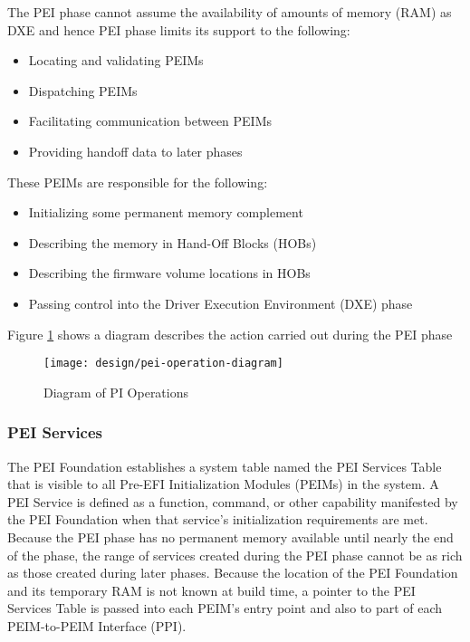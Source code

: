 The PEI phase cannot assume the availability of amounts of memory (RAM) as DXE and hence PEI phase limits its support to the following:
\begin{itemize}
	\item Locating and validating PEIMs
	\item Dispatching PEIMs
	\item Facilitating communication between PEIMs
	\item Providing handoff data to later phases
\end{itemize}

These PEIMs are responsible for the following:
\begin{itemize}
	\item Initializing some permanent memory complement
	\item Describing the memory in Hand-Off Blocks (HOBs)
	\item Describing the firmware volume locations in HOBs
	\item Passing control into the Driver Execution Environment (DXE) phase
\end{itemize}

Figure \ref{fig:design-pei-operation-diagram} shows a diagram describes the action carried out during the PEI phase

\begin{figure}[h]
	\centering
	\texttt{[image: design/pei-operation-diagram]}
	\caption{Diagram of PI Operations}\label{fig:design-pei-operation-diagram}
\end{figure}

\subsubsection{PEI Services}
The PEI Foundation establishes a system table named the PEI Services Table that is visible to all Pre-EFI Initialization Modules (PEIMs) in the system. A PEI Service is defined as a function, command, or other capability manifested by the PEI Foundation when that service’s initialization requirements are met. Because the PEI phase has no permanent memory available until nearly the end of the phase, the range of services created during the PEI phase cannot be as rich as those created during later phases. Because the location of the PEI Foundation and its temporary RAM is not known at build time, a pointer to the PEI Services Table is passed into each PEIM’s entry point and also to part of each PEIM-to-PEIM Interface (PPI). 

